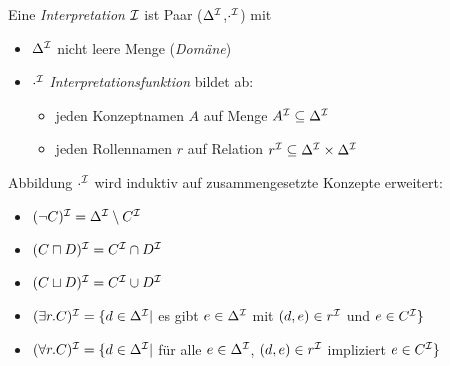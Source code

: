 \begin{definition}
Eine \emph{Interpretation} $\mathcal{I}$ ist Paar ($\Delta^{\mathcal{I}}$,$\cdot^{\mathcal{I}}$) mit
  \begin{itemize}
    \item{$\Delta^{\mathcal{I}}$ nicht leere Menge (\emph{Domäne})}
    \item{$\cdot^{\mathcal{I}}$ \emph{Interpretationsfunktion} bildet ab:
     \begin{itemize}
       \item{jeden Konzeptnamen $A$ auf Menge $A^{\mathcal{I}} \subseteq \Delta^{\mathcal{I}}$}
       \item{jeden Rollennamen $r$ auf Relation $r^{\mathcal{I}} \subseteq \Delta^{\mathcal{I}} \times \Delta^{\mathcal{I}}$}
     \end{itemize}}
  \end{itemize}

Abbildung $\cdot^{\mathcal{I}}$ wird induktiv auf zusammengesetzte Konzepte erweitert:
\begin{itemize}
  \item $(\neg C)^{\mathcal{I}} = \Delta^{\mathcal{I}} \setminus C^{\mathcal{I}}$
  \item $(C \sqcap D)^{\mathcal{I}} = C^{\mathcal{I}} \cap D^{\mathcal{I}}$
  \item $(C \sqcup D)^{\mathcal{I}} = C^{\mathcal{I}} \cup D^{\mathcal{I}}$
  \item $(\exists r.C)^{\mathcal{I}} = \{d \in \Delta^{\mathcal{I}} |$ es gibt $ e \in \Delta^{\mathcal{I}}$ mit $(d,e) \in r^{\mathcal{I}}$ und $e \in C^{\mathcal{I}}\}$
  \item $(\forall r.C)^{\mathcal{I}} = \{d \in \Delta^{\mathcal{I}} |$ für alle $ e \in \Delta^{\mathcal{I}}$, $(d,e) \in r^{\mathcal{I}}$ impliziert $e \in C^{\mathcal{I}}\}$
\end{itemize}
\end{definition}

